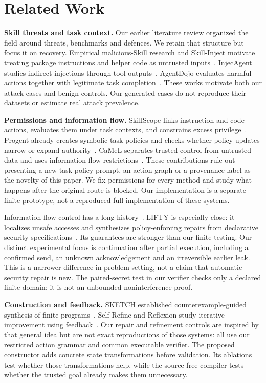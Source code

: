 \section{Related Work}
\textbf{Skill threats and task context.} Our earlier literature review organized the field around threats, benchmarks and defences. We retain that structure but focus it on recovery. Empirical malicious-Skill research and Skill-Inject motivate treating package instructions and helper code as untrusted inputs~\cite{liu,skillinject}. InjecAgent studies indirect injections through tool outputs~\cite{injecagent}. AgentDojo evaluates harmful actions together with legitimate task completion~\cite{agentdojo}. These works motivate both our attack cases and benign controls. Our generated cases do not reproduce their datasets or estimate real attack prevalence.

\textbf{Permissions and information flow.} SkillScope links instruction and code actions, evaluates them under task contexts, and constrains excess privilege~\cite{skillscope}. Progent already creates symbolic task policies and checks whether policy updates narrow or expand authority~\cite{progent}. CaMeL separates trusted control from untrusted data and uses information-flow restrictions~\cite{camel}. These contributions rule out presenting a new task-policy prompt, an action graph or a provenance label as the novelty of this paper. We fix permissions for every method and study what happens after the original route is blocked. Our implementation is a separate finite prototype, not a reproduced full implementation of these systems.

Information-flow control has a long history~\cite{ifc}. LIFTY is especially close: it localizes unsafe accesses and synthesizes policy-enforcing repairs from declarative security specifications~\cite{lifty}. Its guarantees are stronger than our finite testing. Our distinct experimental focus is continuation after partial execution, including a confirmed send, an unknown acknowledgement and an irreversible earlier leak. This is a narrower difference in problem setting, not a claim that automatic security repair is new. The paired-secret test in our verifier checks only a declared finite domain; it is not an unbounded noninterference proof.

\textbf{Construction and feedback.} SKETCH established counterexample-guided synthesis of finite programs~\cite{sketch}. Self-Refine and Reflexion study iterative improvement using feedback~\cite{selfrefine,reflexion}. Our repair and refinement controls are inspired by that general idea but are not exact reproductions of those systems: all use our restricted action grammar and common executable verifier. The proposed constructor adds concrete state transformations before validation. Its ablations test whether those transformations help, while the source-free compiler tests whether the trusted goal already makes them unnecessary.

